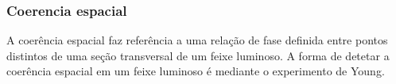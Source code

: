 \documentclass[article]{IEEEtran}
\begin{document}
\subsubsection{Coerencia espacial}
A coerência espacial faz referência a uma relação de fase definida entre pontos distintos de uma seção transversal de um feixe luminoso.
A forma de detetar a coerência espacial em um feixe luminoso é mediante o experimento de Young. 


\end{document}
